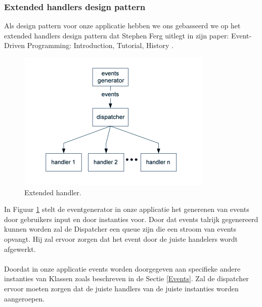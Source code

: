 \documentclass[]{article}
\begin{document}
\subsubsection{Extended handlers design pattern}
Als design pattern voor onze applicatie hebben we ons gebasseerd we op het extended handlers design pattern dat Stephen Ferg uitlegt in zijn paper: Event-Driven Programming: Introduction, Tutorial, History \cite{eventdrivenStephen}.
\begin{figure}[H]
  \centering
\includegraphics[scale=0.5]{AnalyseADTAlgorithm/extendedHandlerspattern.png}
  \caption{Extended handler.} \label{extendedHandler}
\end{figure}

In Figuur \ref{extendedHandler} stelt de eventgenerator in onze applicatie het generenen van events door gebruikers input en door instanties voor. Door dat events talrijk gegenereerd kunnen worden zal de Dispatcher een queue zijn die een stroom van events opvangt. Hij zal ervoor zorgen dat het event door de juiste handelers wordt afgewerkt.\\\\
Doordat in onze applicatie events worden doorgegeven aan specifieke andere instanties van Klassen zoals beschreven in de Sectie \ref{Events}. Zal de dispatcher ervoor moeten zorgen dat de juiste handlers van de juiste instanties worden aangeroepen.
\end{document}
